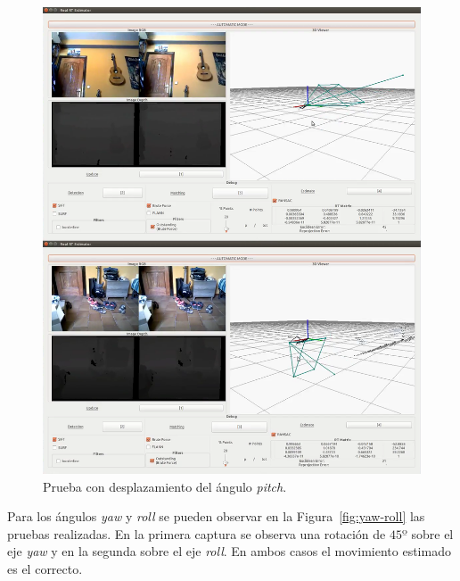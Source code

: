 \begin{figure}[th]
\centering
\includegraphics[scale=0.35]{Figures/tests/pitch.png}
\decoRule
\caption[Prueba con desplazamiento del ángulo \textit{pitch}]{Prueba con desplazamiento del ángulo \textit{pitch}.}
\label{fig:pitch}
\end{figure}

Para los ángulos \textit{yaw} y \textit{roll} se pueden observar en la Figura~\ref{fig:yaw-roll} las pruebas realizadas. En la primera captura se observa una rotación de $45º$ sobre el eje \textit{yaw} y en la segunda sobre el eje \textit{roll}. En ambos casos el movimiento estimado es el correcto.

